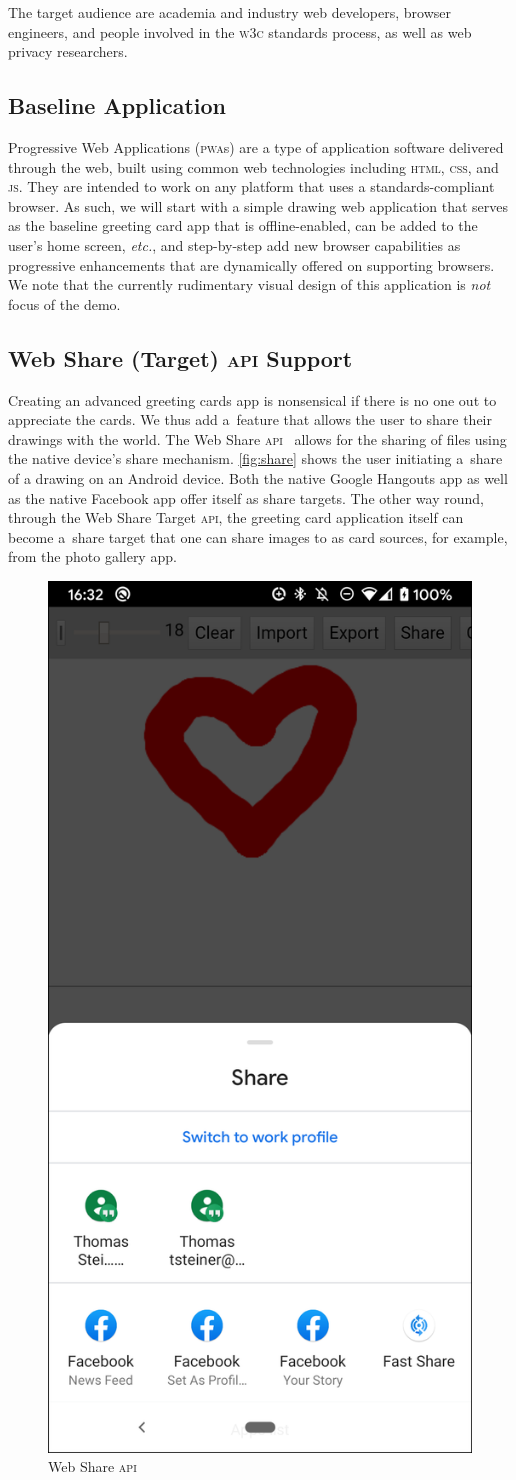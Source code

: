 \documentclass[sigconf]{acmart}
\begin{document}
The target audience are academia and industry web developers, browser engineers,
and people involved in the \textsc{w3c} standards process,
as well as web privacy researchers.

\subsection{Baseline Application}

Progressive Web Applications (\textsc{pwa}s) are a type of application software
delivered through the web, built using common web technologies
including \textsc{html}, \textsc{css}, and \textsc{js}.
They are intended to work on any platform that uses a standards-compliant browser.
As such, we will start with a simple drawing web application
that serves as the baseline greeting card app that is offline-enabled,
can be added to the user's home screen, \textit{etc.},
and step-by-step add new browser capabilities
as progressive enhancements that are dynamically offered on supporting browsers.
We note that the currently rudimentary visual design of this application is \textit{not} focus of the demo.

\subsection{Web Share (Target) \textsc{api} Support}

Creating an advanced greeting cards app is nonsensical if there is no one out to appreciate the cards.
We thus add a~feature that allows the user to share their drawings with the world.
The Web Share \textsc{api}~\cite{giuca2017webshare} allows for the sharing of files
using the native device's share mechanism.
\autoref{fig:share} shows the user initiating a~share of a drawing on an Android device.
Both the native Google Hangouts app as well as the native Facebook app offer itself
as share targets.
The other way round, through the Web Share Target \textsc{api},
the greeting card application itself can become a~share target
that one can share images to as card sources, for example, from the photo gallery app.

\begin{figure}[hbt]
  \includegraphics[width=0.3\columnwidth]{share.png}
  \caption{Web Share \textsc{api}}
  \label{fig:share}
\end{figure}
\end{document}
